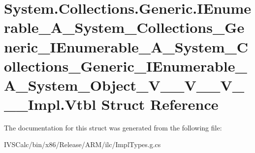 \hypertarget{struct_system_1_1_collections_1_1_generic_1_1_i_enumerable___a___system___collections___generic_68a0a20f87b1d673ecc8cd8eab3c4be6}{}\section{System.\+Collections.\+Generic.\+I\+Enumerable\+\_\+\+A\+\_\+\+System\+\_\+\+Collections\+\_\+\+Generic\+\_\+\+I\+Enumerable\+\_\+\+A\+\_\+\+System\+\_\+\+Collections\+\_\+\+Generic\+\_\+\+I\+Enumerable\+\_\+\+A\+\_\+\+System\+\_\+\+Object\+\_\+\+V\+\_\+\+\_\+\+V\+\_\+\+\_\+\+V\+\_\+\+\_\+\+\_\+\+Impl.\+Vtbl Struct Reference}
\label{struct_system_1_1_collections_1_1_generic_1_1_i_enumerable___a___system___collections___generic_68a0a20f87b1d673ecc8cd8eab3c4be6}


The documentation for this struct was generated from the following file\+:\begin{DoxyCompactItemize}
\item 
I\+V\+S\+Calc/bin/x86/\+Release/\+A\+R\+M/ilc/Impl\+Types.\+g.\+cs\end{DoxyCompactItemize}
